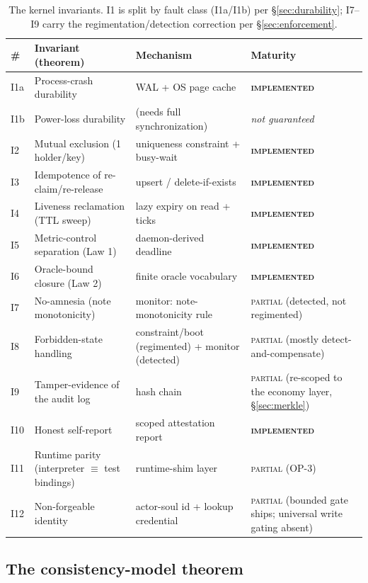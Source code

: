 \documentclass[11pt,a4paper]{article}
\newcommand{\Built}{{\textcolor{hhink}{\textsc{\textbf{implemented}}}}}
\newcommand{\BuiltWeak}{{\textcolor{hhink}{\textsc{partial}}}}
\newcommand{\NotGuar}{{\textcolor{hhink}{\textit{not guaranteed}}}}
\theoremstyle{definition}
\theoremstyle{remark}
\begin{document}
\renewcommand{\arraystretch}{1.2}
\begin{table}[H]
\centering
\caption{The kernel invariants. I1 is split by fault class (I1a/I1b) per
\S\ref{sec:durability}; I7--I9 carry the regimentation/detection correction per
\S\ref{sec:enforcement}.}
\label{tab:invariants}
\small
\begin{tabularx}{\textwidth}{@{}p{} >{\raggedright\arraybackslash}X >{\raggedright\arraybackslash}p{} >{\raggedright\arraybackslash}p{}@{}}
\toprule
\textbf{\#} & \textbf{Invariant (theorem)} & \textbf{Mechanism} & \textbf{Maturity} \\
\midrule
I1a & Process-crash durability & WAL + OS page cache & \Built \\
I1b & Power-loss durability & (needs full synchronization) & \NotGuar \\
I2 & Mutual exclusion (1 holder/key) & uniqueness constraint + busy-wait & \Built \\
I3 & Idempotence of re-claim/re-release & upsert / delete-if-exists & \Built \\
I4 & Liveness reclamation (TTL sweep) & lazy expiry on read + ticks & \Built \\
I5 & Metric-control separation (Law 1) & daemon-derived deadline & \Built \\
I6 & Oracle-bound closure (Law 2) & finite oracle vocabulary & \Built \\
I7 & No-amnesia (note monotonicity) & monitor: note-monotonicity rule & \BuiltWeak{} (detected, not regimented) \\
I8 & Forbidden-state handling & constraint/boot (regimented) + monitor (detected) & \BuiltWeak{} (mostly detect-and-compensate) \\
I9 & Tamper-evidence of the audit log & hash chain & \BuiltWeak{} (re-scoped to the economy layer, \S\ref{sec:merkle}) \\
I10 & Honest self-report & scoped attestation report & \Built \\
I11 & Runtime parity (interpreter $\equiv$ test bindings) & runtime-shim layer & \BuiltWeak{} (OP-3) \\
I12 & Non-forgeable identity & actor-soul id + lookup credential & \BuiltWeak{} (bounded gate ships; universal write gating absent) \\
\bottomrule
\end{tabularx}
\end{table}

\subsection{The consistency-model theorem}
\end{document}
